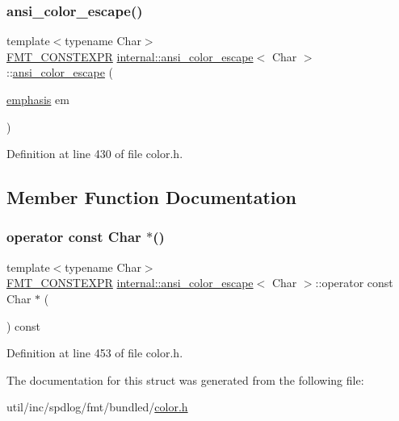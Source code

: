 \subsubsection{\texorpdfstring{ansi\+\_\+color\+\_\+escape()}{ansi\_color\_escape()}\hspace{0.1cm}{\footnotesize\ttfamily [2/2]}}
{\footnotesize\ttfamily template$<$typename Char$>$ \\
\hyperlink{core_8h_a69201cb276383873487bf68b4ef8b4cd}{F\+M\+T\+\_\+\+C\+O\+N\+S\+T\+E\+X\+PR} \hyperlink{structinternal_1_1ansi__color__escape}{internal\+::ansi\+\_\+color\+\_\+escape}$<$ Char $>$\+::\hyperlink{structinternal_1_1ansi__color__escape}{ansi\+\_\+color\+\_\+escape} (\begin{DoxyParamCaption}\item[{\hyperlink{color_8h_a535b59b8edc8902bb3c4f254625f91ba}{emphasis}}]{em }\end{DoxyParamCaption})\hspace{0.3cm}{\ttfamily [inline]}}



Definition at line 430 of file color.\+h.



\subsection{Member Function Documentation}
\mbox{\label{structinternal_1_1ansi__color__escape_a7e81490080d70a2b39b9168d160a02b0}} 
\subsubsection{\texorpdfstring{operator const Char $\ast$()}{operator const Char *()}}
{\footnotesize\ttfamily template$<$typename Char$>$ \\
\hyperlink{core_8h_a69201cb276383873487bf68b4ef8b4cd}{F\+M\+T\+\_\+\+C\+O\+N\+S\+T\+E\+X\+PR} \hyperlink{structinternal_1_1ansi__color__escape}{internal\+::ansi\+\_\+color\+\_\+escape}$<$ Char $>$\+::operator const Char $\ast$ (\begin{DoxyParamCaption}{ }\end{DoxyParamCaption}) const\hspace{0.3cm}{\ttfamily [inline]}}



Definition at line 453 of file color.\+h.



The documentation for this struct was generated from the following file\+:\begin{DoxyCompactItemize}
\item 
util/inc/spdlog/fmt/bundled/\hyperlink{color_8h}{color.\+h}\end{DoxyCompactItemize}
